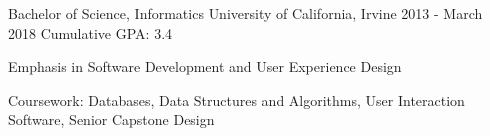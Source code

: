 

\begin{cventries}


    \cventry
    {Bachelor of Science, Informatics}%
    {University of California, Irvine}%
    {2013 - March 2018}  
    {Cumulative GPA: 3.4}  
    {
    	\begin{cvitems} %
    		\item {Emphasis in Software Development and User Experience Design}
    		\item {Coursework: Databases, Data Structures and Algorithms, User Interaction Software, Senior Capstone Design}
    	\end{cvitems}
    }

\end{cventries}

